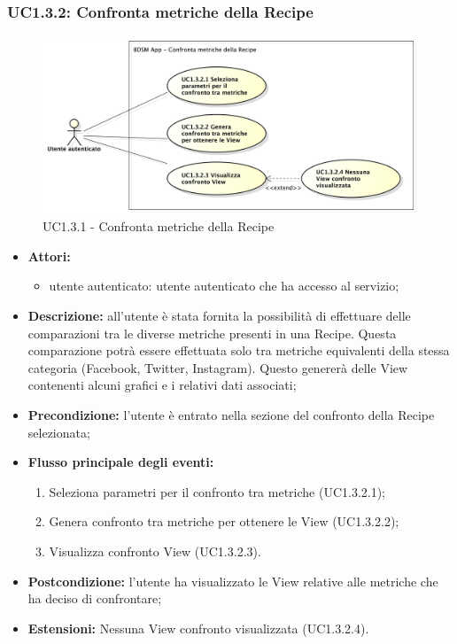 \subsubsection{UC1.3.2: Confronta metriche della Recipe}
\begin{figure}[!htbp]
	\centering
	\centerline{\includegraphics[scale=0.45]{./images/UC1_3_2.pdf}}
	\caption{UC1.3.1 - Confronta metriche della Recipe}
\end{figure}

\begin{itemize}
	\item \textbf{Attori:}
	\begin{itemize}
		\item utente autenticato: utente autenticato che ha accesso al servizio;
	\end{itemize}
	\item \textbf{Descrizione:} all'utente è stata fornita la possibilità di effettuare delle comparazioni tra le diverse metriche presenti in una Recipe. Questa comparazione potrà essere effettuata solo tra metriche equivalenti della stessa categoria (Facebook, Twitter, Instagram). Questo genererà delle View contenenti alcuni grafici e i relativi dati associati;
	\item \textbf{Precondizione:} l'utente è entrato nella sezione del confronto della Recipe selezionata;
	\item \textbf{Flusso principale degli eventi:}
		\begin{enumerate}
			\item Seleziona parametri per il confronto tra metriche (UC1.3.2.1);
			\item Genera confronto tra metriche per ottenere le View (UC1.3.2.2);
			\item Visualizza confronto View (UC1.3.2.3).
		\end{enumerate}
	\item \textbf{Postcondizione:} l'utente ha visualizzato le View relative alle metriche che ha deciso di confrontare;
	\item \textbf{Estensioni:} Nessuna View confronto visualizzata (UC1.3.2.4).

\end{itemize}

